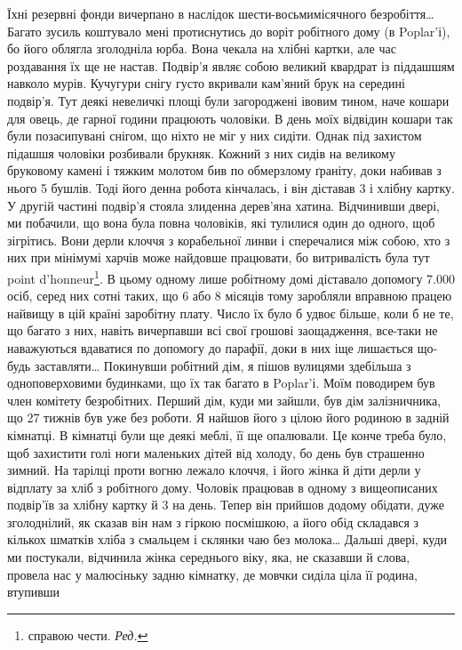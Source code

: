 Їхні резервні фонди вичерпано в наслідок шести-восьмимісячного
безробіття\dots{} Багато зусиль коштувало мені протиснутись
до воріт робітного дому (в Poplar’і), бо його облягла зголодніла
юрба. Вона чекала на хлібні картки, але час роздавання
їх ще не настав. Подвір’я являє собою великий квардрат із
піддашшям навколо мурів. Кучугури снігу густо вкривали
кам’яний брук на середині подвір’я. Тут деякі невеличкі площі
були загороджені івовим тином, наче кошари для овець, де гарної
години працюють чоловіки. В день моїх відвідин кошари так
були позасипувані снігом, що ніхто не міг у них сидіти. Однак
під захистом підашшя чоловіки розбивали брукняк. Кожний з
них сидів на великому бруковому камені і тяжким молотом бив
по обмерзлому ґраніту, доки набивав з нього 5 бушлів. Тоді його
денна робота кінчалась, і він діставав 3 і хлібну картку.
У другій частині подвір’я стояла злиденна дерев’яна хатина.
Відчинивши двері, ми побачили, що вона була повна чоловіків,
які тулилися один до одного, щоб зігрітись. Вони дерли клоччя
з корабельної линви і сперечалися між собою, хто з них при мінімумі
харчів може найдовше працювати, бо витривалість була
тут point d’honneur\footnote*{
справою чести. \emph{Ред.}
}. В цьому одному лише робітному домі діставало
допомогу \num{7.000} осіб, серед них сотні таких, що 6 або 8 місяців
тому заробляли вправною працею найвищу в цій країні
заробітну плату. Число їх було б удвоє більше, коли б не те,
що багато з них, навіть вичерпавши всі свої грошові заощадження,
все-таки не наважуються вдаватися по допомогу до парафії,
доки в них іще лишається що-будь заставляти\dots{} Покинувши робітний
дім, я пішов вулицями здебільша з одноповерховими будинками,
що їх так багато в Poplar’і. Моїм поводирем був член
комітету безробітних. Перший дім, куди ми зайшли, був дім
залізничника, що 27 тижнів був уже без роботи. Я найшов його
з цілою його родиною в задній кімнатці. В кімнатці були ще
деякі меблі, її ще опалювали. Це конче треба було, щоб захистити
голі ноги маленьких дітей від холоду, бо день був страшенно
зимний. На тарілці проти вогню лежало клоччя, і його жінка
й діти дерли у відплату за хліб з робітного дому. Чоловік працював
в одному з вищеописаних подвір’їв за хлібну картку й
3 на день. Тепер він прийшов додому обідати, дуже зголоднілий,
як сказав він нам з гіркою посмішкою, а його обід
складався з кількох шматків хліба з смальцем і склянки чаю
без молока\dots{} Дальші двері, куди ми постукали, відчинила жінка
середнього віку, яка, не сказавши й слова, провела нас у малюсіньку
задню кімнатку, де мовчки сиділа ціла її родина, втупивши
\parbreak{}  %
